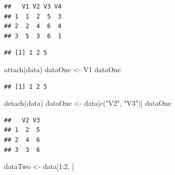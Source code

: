 \documentclass[]{article}
\newenvironment{Shaded}{\begin{snugshade}}{\end{snugshade}}
\newcommand{\DecValTok}[1]{\textcolor[rgb]{0.00,0.00,0.81}{#1}}
\newcommand{\FunctionTok}[1]{\textcolor[rgb]{0.00,0.00,0.00}{#1}}
\newcommand{\NormalTok}[1]{#1}
\newcommand{\OtherTok}[1]{\textcolor[rgb]{0.56,0.35,0.01}{#1}}
\newcommand{\SpecialCharTok}[1]{\textcolor[rgb]{0.00,0.00,0.00}{#1}}
\newcommand{\StringTok}[1]{\textcolor[rgb]{0.31,0.60,0.02}{#1}}
\begin{document}
\begin{verbatim}
##   V1 V2 V3 V4
## 1  1  2  5  3
## 2  2  4  6  4
## 3  5  3  6  1
\end{verbatim}

\begin{Shaded}
\end{Shaded}

\begin{verbatim}
## [1] 1 2 5
\end{verbatim}

\begin{Shaded}
\begin{Highlighting}[]
\FunctionTok{attach}\NormalTok{(data)}
\NormalTok{dataOne }\OtherTok{\textless{}{-}}\NormalTok{ V1}
\NormalTok{dataOne}
\end{Highlighting}
\end{Shaded}

\begin{verbatim}
## [1] 1 2 5
\end{verbatim}

\begin{Shaded}
\begin{Highlighting}[]
\FunctionTok{detach}\NormalTok{(data)}
\NormalTok{dataOne }\OtherTok{\textless{}{-}}\NormalTok{ data[}\FunctionTok{c}\NormalTok{(}\StringTok{"V2"}\NormalTok{, }\StringTok{"V3"}\NormalTok{)]}
\NormalTok{dataOne}
\end{Highlighting}
\end{Shaded}

\begin{verbatim}
##   V2 V3
## 1  2  5
## 2  4  6
## 3  3  6
\end{verbatim}

\begin{Shaded}
\begin{Highlighting}[]
\NormalTok{dataTwo }\OtherTok{\textless{}{-}}\NormalTok{ data[}\DecValTok{1}\SpecialCharTok{:}\DecValTok{2}\NormalTok{, ]}
\end{Highlighting}
\end{Shaded}

\begin{Shaded}
\end{Shaded}
\end{document}

